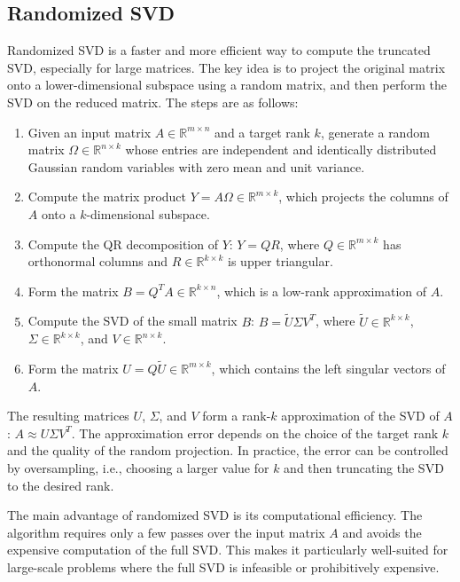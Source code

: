 \subsection*{Randomized SVD}

Randomized SVD is a faster and more efficient way to compute the truncated SVD, especially for large matrices. The key idea is to project the original matrix onto a lower-dimensional subspace using a random matrix, and then perform the SVD on the reduced matrix. The steps are as follows:

\begin{enumerate}

    \item Given an input matrix $A \in \mathbb{R}^{m \times n}$ and a target rank $k$, generate a random matrix $\Omega \in \mathbb{R}^{n \times k}$ whose entries are independent and identically distributed Gaussian random variables with zero mean and unit variance.

    

    \item Compute the matrix product $Y = A\Omega \in \mathbb{R}^{m \times k}$, which projects the columns of $A$ onto a $k$-dimensional subspace.

    

    \item Compute the QR decomposition of $Y$: $Y = QR$, where $Q \in \mathbb{R}^{m \times k}$ has orthonormal columns and $R \in \mathbb{R}^{k \times k}$ is upper triangular.

    

    \item Form the matrix $B = Q^T A \in \mathbb{R}^{k \times n}$, which is a low-rank approximation of $A$.

    

    \item Compute the SVD of the small matrix $B$: $B = \tilde{U} \Sigma V^T$, where $\tilde{U} \in \mathbb{R}^{k \times k}$, $\Sigma \in \mathbb{R}^{k \times k}$, and $V \in \mathbb{R}^{n \times k}$.

    

    \item Form the matrix $U = Q\tilde{U} \in \mathbb{R}^{m \times k}$, which contains the left singular vectors of $A$.

\end{enumerate}

The resulting matrices $U$, $\Sigma$, and $V$ form a rank-$k$ approximation of the SVD of $A$: $A \approx U\Sigma V^T$. The approximation error depends on the choice of the target rank $k$ and the quality of the random projection. In practice, the error can be controlled by oversampling, i.e., choosing a larger value for $k$ and then truncating the SVD to the desired rank.

The main advantage of randomized SVD is its computational efficiency. The algorithm requires only a few passes over the input matrix $A$ and avoids the expensive computation of the full SVD. This makes it particularly well-suited for large-scale problems where the full SVD is infeasible or prohibitively expensive.